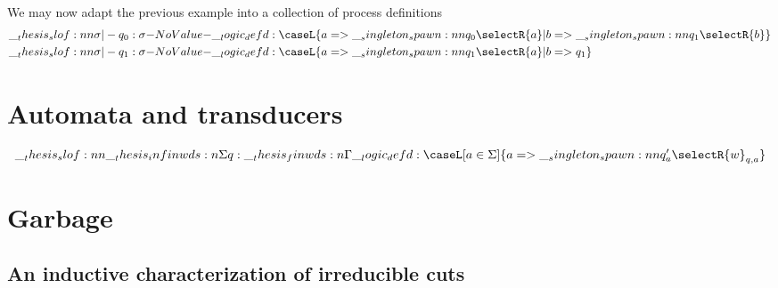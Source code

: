 \begin{example*}
  We may now adapt the previous example into a collection of process definitions
  \begin{align*}
    \slof{\sigma |- q_0 : \sigma} &\defd
      \caseL{a => \spawn{q_0}{\selectR{a}}
           | b => \spawn{q_1}{\selectR{b}}}
    \\
    \slof{\sigma |- q_1 : \sigma} &\defd
      \caseL{a => \spawn{q_1}{\selectR{a}}
           | b => q_1}
  \end{align*}
\end{example*}


\section{Automata and transducers}

\begin{equation*}
  \slof{\infinwds{\Sigma} |- q : \finwds{\Gamma}}
  \defd
  \caseL[a \in \Sigma]{a => \spawn{q'_a}{\selectR{w}_{q,a}}}
\end{equation*}

\section{Garbage}

\subsection{An inductive characterization of irreducible cuts}



